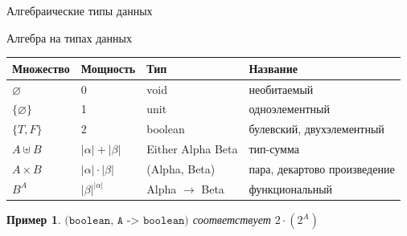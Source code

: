 \documentclass[aspectratio=169]{beamer}
\newtheorem{exm}{Пример}[section]
\begin{document}
\newcommand\doubleplus{+\kern-1.3ex+\kern0.8ex}
\newcommand\mdoubleplus{\ensuremath{\mathbin{+\mkern-10mu+}}}

\begin{frame}{}
\LARGE\begin{center}Алгебраические типы данных\end{center}
\end{frame}

\begin{frame}{Алгебра на типах данных}

\begin{center}\begin{tabular}{llll}
Множество & Мощность & Тип & Название\\\hline
$\varnothing$ & 0 & void & необитаемый\\
$\{\varnothing\}$ & 1 & unit & одноэлементный\\
$\{T,F\}$ & 2 & boolean & булевский, двухэлементный\\
$A \uplus B$ & $|\alpha|+|\beta|$ & Either Alpha Beta & тип-сумма\\
$A \times B$ & $|\alpha|\cdot|\beta|$ & (Alpha, Beta) & пара, декартово произведение\\
$B^A$ & $|\beta|^{|\alpha|}$ & Alpha $\rightarrow$ Beta & функциональный\\
\end{tabular}\end{center}

\begin{exm}
$\texttt{(boolean, A -> boolean)}$ соответствует $2\cdot(2^A)$
\end{exm}
\end{frame}
\end{document}
